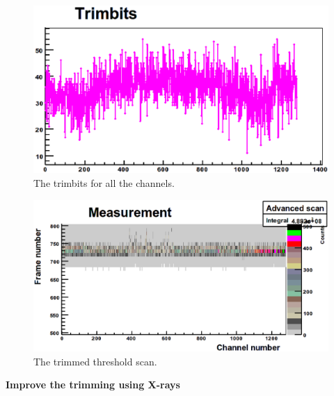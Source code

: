 \begin{figure}
\begin{center}
\includegraphics[width=\textwidth]{images/trimbitplot}
\end{center}
\caption{The trimbits for all the channels.}\label{fig:trimplot}
\end{figure}

\begin{figure}
\begin{center}
\includegraphics[width=\textwidth]{images/noise_thresholdscantrimmed}
\end{center}
\caption{The trimmed threshold scan.}\label{fig:thresholdscantrimmed}
\end{figure}
\textbf{
Improve the trimming using X-rays}\label{sec:improvetrimming}\\

